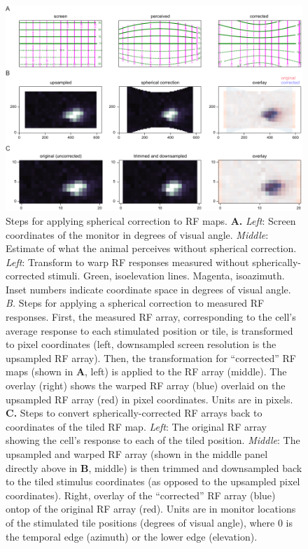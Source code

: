 \begin{figure}[hbt!]
\includegraphics[width=\textwidth]{figures/supplemental/fig_s8_spherical_correction_steps/fig_s8_spherical_correction_steps.pdf}
    \centering
    \caption[Spherical correction]{Steps for applying spherical correction to RF maps.
    \textbf{A.} \textit{Left}: Screen coordinates of the monitor in degrees of visual angle. \textit{Middle}: Estimate of what the animal perceives without spherical correction\cite{Labrigger2012}. \textit{Left}: Transform to warp RF responses measured without spherically-corrected stimuli. Green, isoelevation lines. Magenta, isoazimuth. Inset numbers indicate coordinate space in degrees of visual angle.
    \textit{B.} Steps for applying a spherical correction to measured RF responses. First, the measured RF array, corresponding to the cell's average response to each stimulated position or tile, is transformed to pixel coordinates (left, downsampled screen resolution is the upsampled RF array). Then, the transformation for ``corrected'' RF maps (shown in \textbf{A}, left) is applied to the RF array (middle). The overlay (right) shows the warped RF array (blue) overlaid on the upsampled RF array (red) in pixel coordinates. Units are in pixels.
    \textbf{C.} Steps to convert spherically-corrected RF arrays back to coordinates of the tiled RF map. \textit{Left}: The original RF array showing the cell's response to each of the tiled position. \textit{Middle}:  The upsampled and warped RF array (shown in the middle panel directly above in \textbf{B}, middle) is then trimmed and downsampled back to the tiled stimulus coordinates (as opposed to the upsampled pixel coordinates). Right, overlay of the ``corrected'' RF array (blue) ontop of the original RF array (red). Units are in monitor locations of the stimulated tile positions (degrees of visual angle), where 0 is the temporal edge (azimuth) or the lower edge (elevation).
    \label{supfig:spherical_correction_steps}}
\end{figure}

